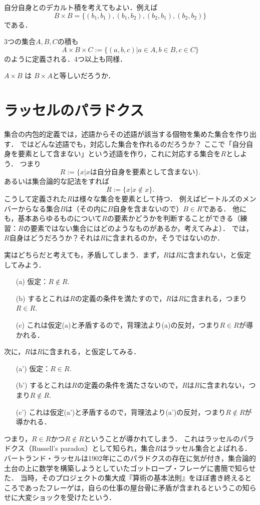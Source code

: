 \documentclass[11pt,a4paper]{jsarticle}
\begin{document}
自分自身とのデカルト積を考えてもよい．例えば
\[
B \times B = \{(b_1, b_1), (b_1, b_2), (b_2, b_1), (b_2, b_2)\}
\]
である．

3つの集合$A, B, C$の積も
\[
 A \times B \times C := \{ (a, b, c) | a \in A, b \in B, c \in C \}
\]
のように定義される．4つ以上も同様．


\begin{exercise}
$A \times B$ は $B \times A$と等しいだろうか．
\end{exercise} 

%


\section{ラッセルのパラドクス}
集合の内包的定義では，述語からその述語が該当する個物を集めた集合を作り出す．
ではどんな述語でも，対応した集合を作れるのだろうか？
ここで「自分自身を要素として含まない」という述語を作り，これに対応する集合を$R$としよう．
つまり
\[
 R := \{x | x \text{は自分自身を要素として含まない}\}.
\]
あるいは集合論的な記法をすれば
\[
 R := \{x | x \not \in x\}.
\]
こうして定義された$R$は様々な集合を要素として持つ．
例えばビートルズのメンバーからなる集合$B$は（その内に$B$自身を含まないので）$B \in R$である．
他にも，基本あらゆるものについて$R$の要素かどうかを判断することができる（練習：$R$の要素ではない集合にはどのようなものがあるか，考えてみよ）．
では，$R$自身はどうだろうか？それは$R$に含まれるのか，そうではないのか．

実はどちらだと考えても，矛盾してしまう．まず，$R$は$R$に含まれない，と仮定してみよう．
\begin{itemize}
 \item[(a)] 仮定：$R \not\in R$.
 \item[(b)] するとこれは$R$の定義の条件を満たすので，$R$は$R$に含まれる，つまり$R \in R$.
 \item[(c)] これは仮定(a)と矛盾するので，背理法より(a)の反対，つまり$R \in R$が導かれる．
\end{itemize}
次に，$R$は$R$に含まれる，と仮定してみる．
\begin{itemize}
 \item[(a')] 仮定：$R \in R$.
 \item[(b')] するとこれは$R$の定義の条件を満たさないので，$R$は$R$に含まれない，つまり$R \not\in R$.
 \item[(c')] これは仮定(a')と矛盾するので，背理法より(a')の反対，つまり$R \not\in R$が導かれる．
\end{itemize}
つまり，$R \in R$かつ$R \not\in R$ということが導かれてしまう．
これはラッセルのパラドクス（Russell's paradox）として知られ，集合$R$はラッセル集合とよばれる．
バートランド・ラッセルは1902年にこのパラドクスの存在に気が付き，集合論的土台の上に数学を構築しようとしていたゴットロープ・フレーゲに書簡で知らせた．
当時，そのプロジェクトの集大成『算術の基本法則』をほぼ書き終えるところであったフレーゲは，自らの仕事の屋台骨に矛盾が含まれるというこの知らせに大変ショックを受けたという．
\end{document}
